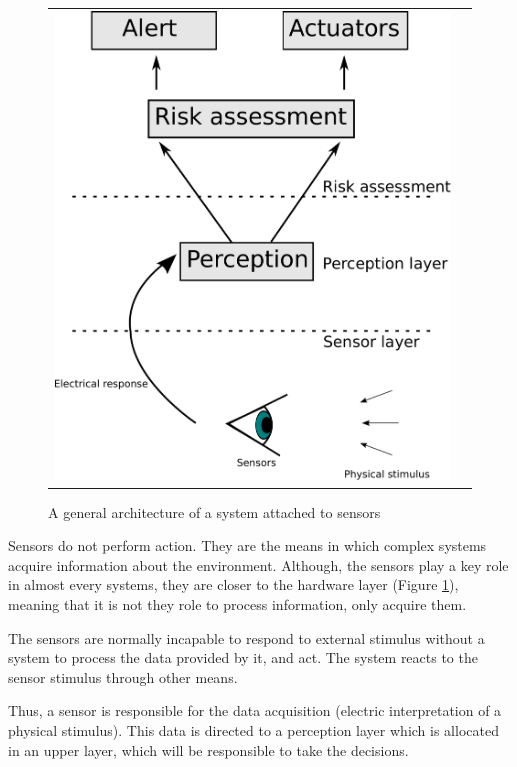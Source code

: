 \begin{figure}[h]
   \centering
     \begin{tabular}{lr}
       \includegraphics[scale=0.45]{img/fig:sensors:role}
     \end{tabular}
   \caption{A general architecture of a system attached to sensors}
   \label{fig:sensors:role}
 \end{figure}

Sensors do not perform action. They are the means in which complex systems acquire information about the environment. Although, the sensors play a key role in almost every systems, they are closer to the hardware layer (Figure \ref{fig:sensors:role}), meaning that it is not they role to process information, only acquire them. 

The sensors are normally incapable to respond to external stimulus without a system to process the data provided by it, and act. The system reacts to the sensor stimulus through other means.

Thus, a sensor is responsible for the data acquisition (electric interpretation of a physical stimulus). This data is directed to a perception layer which is allocated in an upper layer, which will be responsible to take the decisions.

